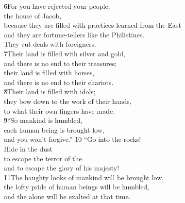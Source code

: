 \begin{poetry}
\poeml \v{6}For you have rejected your people, \\
\poeml the house of Jacob, \\
\poeml because they are filled with practices learned from the East \\
\poeml and they are fortune-tellers like the Philistines. \\
\poeml They cut deals with foreigners. \\
\poeml \v{7}Their land is filled with silver and gold, \\
\poeml and there is no end to their treasures; \\
\poeml their land is filled with horses, \\
\poeml and there is no end to their chariots. \\
\poeml \v{8}Their land is filled with idols; \\
\poeml they bow down to the work of their hands, \\
\poemlll       to what their own fingers have made. \\
\poeml \v{9}``So mankind is humbled, \\
\poemll    each human being is brought low, \\
\poemlll       and you won't forgive.''
\poeml \v{10} ``Go into the rocks! \\
\poemll    Hide in the dust \\
\poeml to escape the terror of the  \\
\poemll    and to escape the glory of his majesty! \\
\poeml \v{11}The haughty looks of mankind will be brought low, \\
\poemll    the lofty pride of human beings will be humbled, \\
\poemlll       and the  alone will be exalted at that time. \\

\end{poetry}
